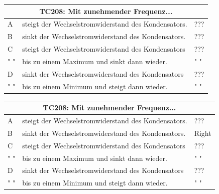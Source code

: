 \begin{frame}
	\begin{small}
	
	
	
	\begin{tabular}{|l|l|l|}
	\hline
		\multicolumn{3}{|c|}{\textbf{TC208: Mit zunehmender Frequenz...}}\\
		\hline
		A & steigt der Wechselstromwiderstand des Kondensators. & ??? \\ \hline
		B & sinkt der Wechselstromwiderstand des Kondensators. & ??? \\ \hline
		C & steigt der Wechselstromwiderstand des Kondensators  & ??? \\ 
		" " & bis zu einem Maximum und sinkt dann wieder. & " " \\ \hline
		D & sinkt der Wechselstromwiderstand des Kondensators & ??? \\
		" " & bis zu einem Minimum und steigt dann wieder. & " " \\ \hline 	
	
	\end{tabular}
	\end{small}
\end{frame}

\begin{frame}
	\begin{small}
	
	
	
	\begin{tabular}{|l|l|l|}
	\hline
		\multicolumn{3}{|c|}{\textbf{TC208: Mit zunehmender Frequenz...}}\\
		\hline
		A & steigt der Wechselstromwiderstand des Kondensators. & ??? \\ \hline
		B & sinkt der Wechselstromwiderstand des Kondensators. & Right \\ \hline
		C & steigt der Wechselstromwiderstand des Kondensators  & ??? \\ 
		" " & bis zu einem Maximum und sinkt dann wieder. & " " \\ \hline
		D & sinkt der Wechselstromwiderstand des Kondensators & ??? \\
		" " & bis zu einem Minimum und steigt dann wieder. & " " \\ \hline 	
	
	\end{tabular}
	\end{small}
\end{frame}

\renewcommand{\refname}{Referenzen}

